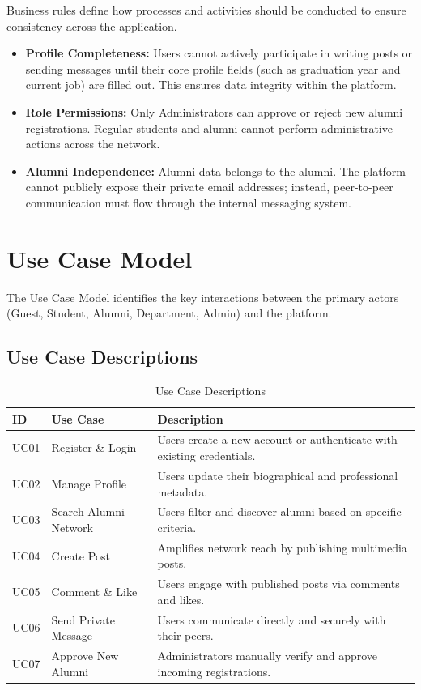 Business rules define how processes and activities should be conducted to ensure consistency across the application.
\begin{itemize}
    \item \textbf{Profile Completeness:} Users cannot actively participate in writing posts or sending messages until their core profile fields (such as graduation year and current job) are filled out. This ensures data integrity within the platform.
    \item \textbf{Role Permissions:} Only Administrators can approve or reject new alumni registrations. Regular students and alumni cannot perform administrative actions across the network.
    \item \textbf{Alumni Independence:} Alumni data belongs to the alumni. The platform cannot publicly expose their private email addresses; instead, peer-to-peer communication must flow through the internal messaging system.
\end{itemize}

\section{Use Case Model}
The Use Case Model identifies the key interactions between the primary actors (Guest, Student, Alumni, Department, Admin) and the platform.

\subsection{Use Case Descriptions}
\begin{table}[H]
    \centering
    \begin{tabular}{|p{1cm}|p{4cm}|p{10cm}|}
        \hline
        \textbf{ID} & \textbf{Use Case} & \textbf{Description} \\
        \hline
        UC01 & Register \& Login & Users create a new account or authenticate with existing credentials. \\
        \hline
        UC02 & Manage Profile & Users update their biographical and professional metadata. \\
        \hline
        UC03 & Search Alumni Network & Users filter and discover alumni based on specific criteria. \\
        \hline
        UC04 & Create Post & Amplifies network reach by publishing multimedia posts. \\
        \hline
        UC05 & Comment \& Like & Users engage with published posts via comments and likes. \\
        \hline
        UC06 & Send Private Message & Users communicate directly and securely with their peers. \\
        \hline
        UC07 & Approve New Alumni & Administrators manually verify and approve incoming registrations. \\
        \hline
    \end{tabular}
    \caption{Use Case Descriptions}
    \label{tab:use_cases}
\end{table}

